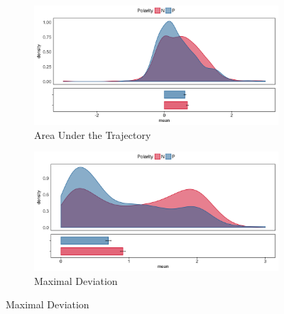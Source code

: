 \documentclass[11pt]{article}
\begin{document}
\begin{figure}
\centering
\begin{subfigure}[b]{0.4\textwidth}
\includegraphics[width=\textwidth]{AUC_negation.png}
\caption{Area Under the Trajectory}
\end{subfigure}
%
\begin{subfigure}[b]{0.4\textwidth}
\includegraphics[width=\textwidth]{MD_negation.png}
\caption{Maximal Deviation}
\end{subfigure}


\end{figure}
\end{document}
